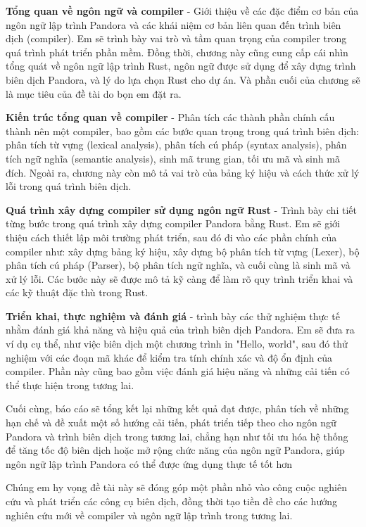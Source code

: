 \begin{mucluc}
    \item {\bf{Tổng quan về ngôn ngữ và compiler}} - 
        Giới thiệu về các đặc điểm cơ bản của ngôn ngữ lập trình 
        Pandora và các khái niệm cơ bản liên quan đến trình biên dịch 
        (compiler). Em sẽ trình bày vai trò và tầm quan trọng của compiler 
        trong quá trình phát triển phần mềm. Đồng thời, chương này cũng 
        cung cấp cái nhìn tổng quát về ngôn ngữ lập trình Rust, ngôn ngữ 
        được sử dụng để xây dựng trình biên dịch Pandora, và 
        lý do lựa chọn Rust cho dự án. Và phần cuối của chương sẽ là mục
        tiêu của đề tài do bọn em đặt ra.
    \item {\bf{Kiến trúc tổng quan về compiler}} - 
        Phân tích các thành phần chính cấu thành nên một compiler, 
        bao gồm các bước quan trọng trong quá trình biên dịch: phân tích 
        từ vựng (lexical analysis), phân tích cú pháp (syntax analysis), 
        phân tích ngữ nghĩa (semantic analysis), sinh mã trung gian, 
        tối ưu mã và sinh mã đích. Ngoài ra, chương này còn mô tả vai 
        trò của bảng ký hiệu và cách thức xử lý lỗi trong quá trình biên 
        dịch.
    \item {\bf{Quá trình xây dựng compiler sử dụng ngôn ngữ Rust}} - 
        Trình bày chi tiết từng bước trong quá trình xây dựng compiler 
        Pandora bằng Rust. Em sẽ giới thiệu cách thiết lập môi trường 
        phát triển, sau đó đi vào các phần chính của compiler như: 
        xây dựng bảng ký hiệu, xây dựng bộ phân tích từ vựng (Lexer), 
        bộ phân tích cú pháp (Parser), bộ phân tích ngữ nghĩa, và cuối 
        cùng là sinh mã và xử lý lỗi. Các bước này sẽ được mô tả kỹ càng 
        để làm rõ quy trình triển khai và các kỹ thuật đặc thù trong Rust.
    \item {\bf{Triển khai, thực nghiệm và đánh giá}} - 
        trình bày các thử nghiệm thực tế nhằm đánh giá khả năng và hiệu quả 
        của trình biên dịch Pandora. Em sẽ đưa ra ví dụ cụ thể, như việc 
        biên dịch một chương trình in "Hello, world", sau đó thử nghiệm 
        với các đoạn mã khác để kiểm tra tính chính xác và độ ổn định của 
        compiler. Phần này cũng bao gồm việc đánh giá hiệu năng và những 
        cải tiến có thể thực hiện trong tương lai.
\end{mucluc}

Cuối cùng, báo cáo sẽ tổng kết lại những kết quả đạt được, phân tích về những
hạn chế và đề xuất một số hướng cải tiến, phát triển tiếp theo cho ngôn ngữ Pandora và trình biên dịch trong
tương lai, chẳng hạn như tối ưu hóa hệ thống để tăng tốc độ biên dịch hoặc mở
rộng chức năng của ngôn ngữ Pandora, giúp ngôn ngữ lập trình Pandora có thể được ứng dụng thực tế tốt hơn

Chúng em hy vọng đề tài này sẽ đóng góp một phần nhỏ vào công cuộc nghiên cứu và phát triển các công cụ biên dịch, đồng thời tạo tiền đề cho các hướng nghiên cứu mới về compiler và ngôn ngữ lập trình trong tương lai.

